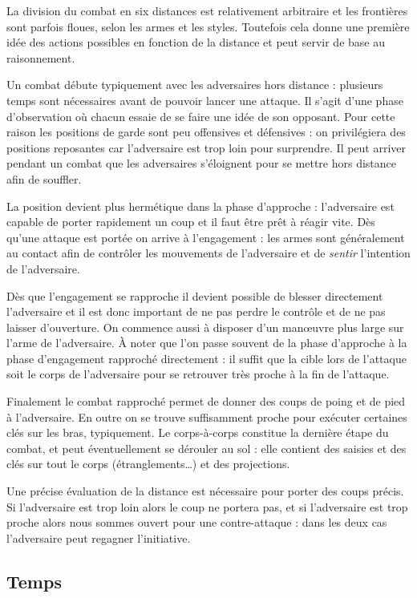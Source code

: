 La division du combat en six distances est relativement arbitraire et les frontières sont parfois floues, selon les armes et les styles.
Toutefois cela donne une première idée des actions possibles en fonction de la distance et peut servir de base au raisonnement.

Un combat débute typiquement avec les adversaires hors distance : plusieurs temps sont nécessaires avant de pouvoir lancer une attaque.
Il s'agit d'une phase d'observation où chacun essaie de se faire une idée de son opposant.
Pour cette raison les positions de garde sont peu offensives et défensives : on privilégiera des positions reposantes car l'adversaire est trop loin pour surprendre.
Il peut arriver pendant un combat que les adversaires s'éloignent pour se mettre hors distance afin de souffler.

La position devient plus hermétique dans la phase d'approche : l'adversaire est capable de porter rapidement un coup et il faut être prêt à réagir vite.
Dès qu'une attaque est portée on arrive à l'engagement : les armes sont généralement au contact afin de contrôler les mouvements de l'adversaire et de \emph{sentir} l'intention de l'adversaire.

Dès que l'engagement se rapproche il devient possible de blesser directement l'adversaire et il est donc important de ne pas perdre le contrôle et de ne pas laisser d'ouverture.
On commence aussi à disposer d'un manœuvre plus large sur l'arme de l'adversaire.
À noter que l'on passe souvent de la phase d'approche à la phase d'engagement rapproché directement : il suffit que la cible lors de l'attaque soit le corps de l'adversaire pour se retrouver très proche à la fin de l'attaque.

Finalement le combat rapproché permet de donner des coups de poing et de pied à l'adversaire.
En outre on se trouve suffisamment proche pour exécuter certaines clés sur les bras, typiquement.
Le corps-à-corps constitue la dernière étape du combat, et peut éventuellement se dérouler au sol : elle contient des saisies et des clés sur tout le corps (étranglements…) et des projections.

Une précise évaluation de la distance est nécessaire pour porter des coups précis.
Si l'adversaire est trop loin alors le coup ne portera pas, et si l'adversaire est trop proche alors nous sommes ouvert pour une contre-attaque : dans les deux cas l'adversaire peut regagner l'initiative.


\subsection{Temps}


